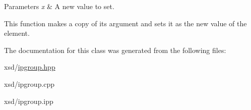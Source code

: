 \begin{DoxyParams}{Parameters}
{\em x} & A new value to set.\\
\hline
\end{DoxyParams}
This function makes a copy of its argument and sets it as the new value of the element. 

The documentation for this class was generated from the following files:\begin{DoxyCompactItemize}
\item 
xsd/\hyperlink{ipgroup_8hpp}{ipgroup.hpp}\item 
xsd/ipgroup.cpp\item 
xsd/ipgroup.ipp\end{DoxyCompactItemize}
